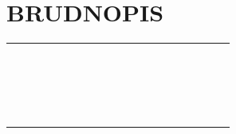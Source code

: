 \documentclass[10pt]{article}
\begin{document}
\section*{BRUDNOPIS}
\begin{center}
\begin{tabular}{|c|c|c|c|c|c|c|c|c|c|c|c|c|c|c|c|c|c|c|c|}
\hline
 &  &  &  &  &  &  &  &  &  &  &  &  &  &  &  &  &  &  & \multirow[t]{2}{*}{} \\
\hline
 &  &  &  &  &  &  &  &  &  &  &  &  &  &  &  &  &  &  &  \\
\hline
 &  &  &  &  &  &  &  &  &  &  &  &  &  &  &  &  &  &  &  \\
\hline
 &  &  &  &  &  &  &  &  &  &  &  &  &  &  &  &  &  &  &  \\
\hline
 &  &  &  &  &  &  &  &  &  &  &  &  &  &  &  &  &  &  &  \\
\hline
 &  &  &  &  &  &  &  &  &  &  &  &  &  &  &  &  &  &  &  \\
\hline
 &  &  &  &  &  &  &  &  &  &  &  &  &  &  &  &  &  &  &  \\
\hline
 &  &  &  &  &  &  &  &  &  &  &  &  &  &  &  &  &  &  &  \\
\hline
 &  &  &  &  &  &  &  &  &  &  &  &  &  &  &  &  &  &  &  \\
\hline
 &  &  &  &  &  &  &  &  &  &  &  &  &  &  &  &  &  &  &  \\
\hline
 &  &  &  &  &  &  &  &  &  &  &  &  &  &  &  &  &  &  &  \\
\hline
 &  &  &  &  &  &  &  &  &  &  &  &  &  &  &  &  &  &  &  \\
\hline
 &  &  &  &  &  &  &  &  &  &  &  &  &  &  &  &  &  &  &  \\
\hline
 &  &  &  &  &  &  &  &  &  &  &  &  &  &  &  &  &  &  &  \\
\hline
 &  &  &  &  &  &  &  &  &  &  &  &  &  &  &  &  &  &  &  \\
\hline
 &  &  &  &  &  &  &  &  &  &  &  &  &  &  &  &  &  &  &  \\
\hline
 &  &  &  &  &  &  &  &  &  &  &  &  &  &  &  &  &  &  &  \\
\hline
 &  &  &  &  &  &  &  &  &  &  &  &  &  &  &  &  &  &  &  \\
\hline
 &  &  &  &  &  &  &  &  &  &  &  &  &  &  &  &  &  &  &  \\
\hline
 &  &  &  &  &  &  &  &  &  &  &  &  &  &  &  &  &  &  &  \\
\hline
 &  &  &  &  &  &  &  &  &  &  &  &  &  &  &  &  &  &  &  \\

\end{tabular}
\end{center}
\end{document}
